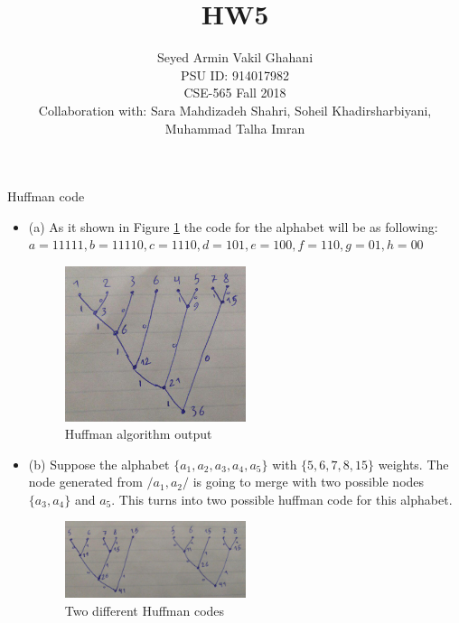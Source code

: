 \documentclass[12pt]{article}
\newenvironment{solution}[2][Solution]{\begin{trivlist}
\item[\hskip \labelsep {\bfseries #1}]}{\end{trivlist}}
\newenvironment{problem}[2][Problem]{\begin{trivlist}
\item[\hskip \labelsep {\bfseries #1}\hskip \labelsep {\bfseries #2.}]}{\end{trivlist}}
\begin{document}
 
\title{\textbf{HW5}}%
\author{Seyed Armin Vakil Ghahani\\ %
PSU ID: 914017982\\
CSE-565 Fall 2018\\
Collaboration with:
Sara Mahdizadeh Shahri, Soheil Khadirsharbiyani,\\
Muhammad Talha Imran} %
 
\maketitle
\begin{problem}{1}
Huffman code
\end{problem}

\begin{solution}{}
\begin{itemize}
\item (a) As it shown in Figure \ref{fig:1a} the code for the alphabet will
be as following:
$a = 11111, b = 11110, c = 1110, d = 101, e = 100, f = 110, g = 01, h = 00$
\begin{figure}[H]
 \centering
 \includegraphics[width=0.50\textwidth]{1a.jpg}
 \caption{Huffman algorithm output
 \label{fig:1a}}
\end{figure}

\item (b) Suppose the alphabet $\{ a_1, a_2, a_3, a_4, a_5\}$ with 
$\{5,6,7,8,15\}$ weights. The node generated from $/{a_1, a_2/}$ is going to
merge with two possible nodes $\{a_3, a_4\}$ and $a_5$. This turns into two
possible huffman code for this alphabet.
\begin{figure}[H]
 \centering
 \includegraphics[width=0.50\textwidth]{1b.jpg}
 \caption{Two different Huffman codes
 \label{fig:1b}}
\end{figure}

\end{itemize}
\end{solution}
\end{document}

